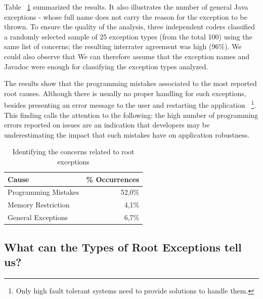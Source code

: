 \documentclass[conference]{IEEEtran}
\begin{document}
Table ~\ref{tab:causes} summarized the results. It also illustrates the number of general Java exceptions - 
whose full name does not carry the reason for the exception to be thrown.
To ensure the quality of the analysis, three independent coders classified a randomly selected
sample of 25 exception types (from the total 100) using the same list of concerns;
the resulting interrater agreement was high (96\%). We could also observe that
We can therefore assume that the exception names and Javadoc 
were enough for classifying the exception types analyzed. 

The results show that the programming mistakes associated to the most reported root causes. 
Although there is usually no proper handling for such exceptions, 
besides presenting an error message to the user and restarting the application ~\footnote{Only 
high fault tolerant systems need to provide solutions to handle them.}.  
This finding calls the attention to the following: the high number of programming errors reported 
on issues are an indication that developers may be underestimating the impact that such 
mistakes have on application robustness.

\begin{table}
  \centering
  \begin{tabular}{lr}
    \hline
    \bfseries{Cause} &  \bfseries{\% Occurrences} \\
    \hline
      Programming Mistakes &  52,0\%\\ 
      Memory Restriction   &   4,1\% \\ 
      General Exceptions   &  6,7\%\\
    \hline
 \end{tabular}
  \caption{Identifying the concerns related to root exceptions}
  \label{tab:causes}
\end{table}



\noindent {}

\subsection{What can the Types of Root Exceptions tell us?}
\end{document}
